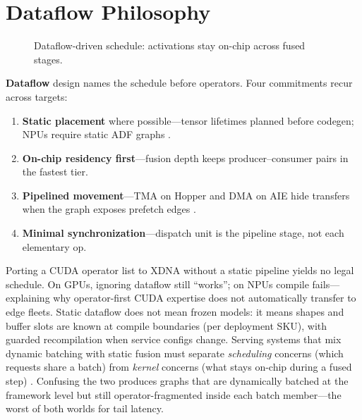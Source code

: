 \section{Dataflow Philosophy}
\label{sec:dataflow_philosophy}
\begin{figure}[t]
\centering
{}
\caption{Dataflow-driven schedule: activations stay on-chip across fused stages.}
\label{fig:dataflow_residency}
\end{figure}


\textbf{Dataflow} design names the schedule before operators.
Four commitments recur across targets:
\begin{enumerate}
\item \textbf{Static placement} where possible---tensor lifetimes planned before codegen; NPUs require static ADF graphs \citep{amd2024xdna}.
\item \textbf{On-chip residency first}---fusion depth keeps producer--consumer pairs in the fastest tier.
\item \textbf{Pipelined movement}---TMA on Hopper and DMA on AIE hide transfers when the graph exposes prefetch edges \citep{nvidia2022hopper,amd2024aie}.
\item \textbf{Minimal synchronization}---dispatch unit is the pipeline stage, not each elementary op.
\end{enumerate}
Porting a CUDA operator list to XDNA without a static pipeline yields no legal schedule.
On GPUs, ignoring dataflow still ``works''; on NPUs compile fails---explaining why operator-first CUDA expertise does not automatically transfer to edge fleets.
Static dataflow does not mean frozen models: it means shapes and buffer slots are known at compile boundaries (per deployment SKU), with guarded recompilation when service configs change.
Serving systems that mix dynamic batching with static fusion must separate \emph{scheduling} concerns (which requests share a batch) from \emph{kernel} concerns (what stays on-chip during a fused step) \citep{kwon2023vllm}.
Confusing the two produces graphs that are dynamically batched at the framework level but still operator-fragmented inside each batch member---the worst of both worlds for tail latency.

